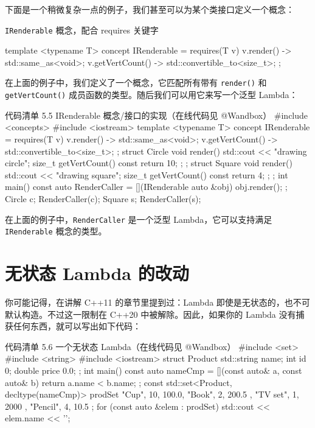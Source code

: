 下面是一个稍微复杂一点的例子，我们甚至可以为某个类接口定义一个概念：

\texttt{IRenderable} 概念，配合 requires 关键字

\begin{codebox}
template <typename T>
concept IRenderable = requires(T v) {
{v.render()} -> std::same_as<void>;
{v.getVertCount()} -> std::convertible_to<size_t>;
};
\end{codebox}

在上面的例子中，我们定义了一个概念，它匹配所有带有 \texttt{render()} 和 \texttt{getVertCount()} 成员函数的类型。随后我们可以用它来写一个泛型 Lambda：

\begin{codeboxt}{代码清单 5.5 IRenderable 概念/接口的实现（在线代码见 @Wandbox）}
#include <concepts>
#include <iostream>
template <typename T>
concept IRenderable = requires(T v) {
{v.render()} -> std::same_as<void>;
{v.getVertCount()} -> std::convertible_to<size_t>;
};
struct Circle {
void render() { std::cout << "drawing circle\n"; }
size_t getVertCount() const { return 10; };
};
struct Square {
void render() { std::cout << "drawing square\n"; }
size_t getVertCount() const { return 4; };
};
int main() {
const auto RenderCaller = [](IRenderable auto &obj) {
obj.render();
};
Circle c;
RenderCaller(c);
Square s;
RenderCaller(s);
}
\end{codeboxt}

在上面的例子中，\texttt{RenderCaller} 是一个泛型 Lambda，它可以支持满足 \texttt{IRenderable} 概念的类型。

\section{无状态 Lambda 的改动}

你可能记得，在讲解 C++11 的章节里提到过：Lambda 即使是无状态的，也不可默认构造。不过这一限制在 C++20 中被解除。因此，如果你的 Lambda 没有捕获任何东西，就可以写出如下代码：

\begin{codeboxt}{代码清单 5.6 一个无状态 Lambda（在线代码见 @Wandbox）}
#include <set>
#include <string>
#include <iostream>
struct Product {
std::string name;
int id {0};
double price { 0.0};
};
int main() {
const auto nameCmp = [](const auto& a, const auto& b) {
return a.name < b.name;
};
const std::set<Product, decltype(nameCmp)> prodSet {
{"Cup", 10, 100.0}, {"Book", 2, 200.5 },
{"TV set", 1, 2000 }, {"Pencil", 4, 10.5}
};
for (const auto &elem : prodSet)
std::cout << elem.name << '\n';
}
\end{codeboxt}

